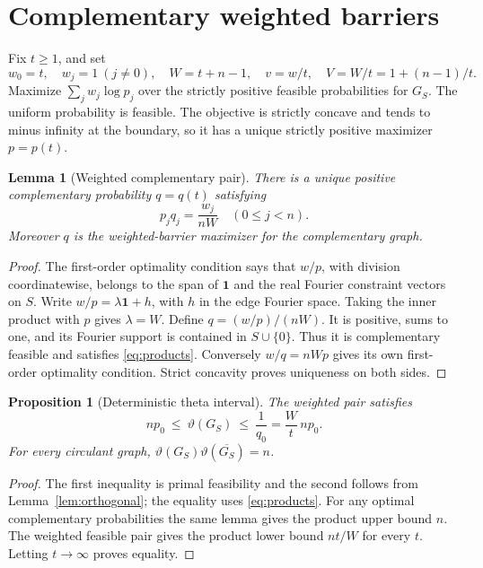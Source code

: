 \documentclass[11pt]{article}
\newtheorem{lemma}[theorem]{Lemma}
\newtheorem{proposition}[theorem]{Proposition}
\theoremstyle{remark}\newtheorem{remark}[theorem]{Remark}
\newcommand{\one}{\mathbf 1}
\newcommand{\tht}{\vartheta}
\begin{document}
\section{Complementary weighted barriers}
Fix $t\ge1$, and set
\begin{equation}\label{eq:parameters}
 w_0=t,\quad w_j=1\ (j\ne0),\quad W=t+n-1,\quad
 v=w/t,\quad V=W/t=1+(n-1)/t.
\end{equation}
Maximize $\sum_j w_j\log p_j$ over the strictly positive feasible
probabilities for $G_S$. The uniform probability is feasible. The objective
is strictly concave and tends to minus infinity at the boundary, so it has
a unique strictly positive maximizer $p=p(t)$.

\begin{lemma}[Weighted complementary pair]\label{lem:pair}
There is a unique positive complementary probability $q=q(t)$ satisfying
\begin{equation}\label{eq:products}
 p_jq_j=\frac{w_j}{nW}\quad(0\le j<n).
\end{equation}
Moreover $q$ is the weighted-barrier maximizer for the complementary graph.
\end{lemma}
\begin{proof}
The first-order optimality condition says that $w/p$, with division
coordinatewise, belongs to the span of $\one$ and the real Fourier constraint
vectors on $S$. Write $w/p=\lambda\one+h$, with $h$ in the edge Fourier
space. Taking the inner product with $p$ gives $\lambda=W$.
Define $q=(w/p)/(nW)$. It is positive, sums to one, and its Fourier support
is contained in $S\cup\{0\}$. Thus it is complementary feasible and satisfies
\eqref{eq:products}. Conversely $w/q=nWp$ gives its own first-order
optimality condition. Strict concavity proves uniqueness on both sides.
\end{proof}

\begin{proposition}[Deterministic theta interval]\label{prop:theta_interval}
The weighted pair satisfies
\begin{equation}\label{eq:interval}
 np_0\ \le\ \tht(G_S)\ \le\ \frac1{q_0}
       =\frac Wt\,np_0.
\end{equation}
For every circulant graph, $\tht(G_S)\tht(\overline{G_S})=n$.
\end{proposition}
\begin{proof}
The first inequality is primal feasibility and the second follows from
Lemma~\ref{lem:orthogonal}; the equality uses \eqref{eq:products}.
For any optimal complementary probabilities the same lemma gives the product
upper bound $n$. The weighted feasible pair gives the product lower bound
$nt/W$ for every $t$. Letting $t\to\infty$ proves equality.
\end{proof}
\end{document}
